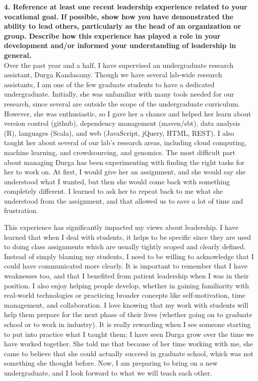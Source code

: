 \documentclass{article}
\begin{document}
\pagestyle{plain}

\noindent\textbf{4.  Reference at least one recent leadership experience related to your vocational goal. If possible, show how you have demonstrated the ability to lead others, particularly as the head of an organization or group. Describe how this experience has played a role in your development and/or informed your understanding of leadership in general.}\\

Over the past year and a half, I have supervised an undergraduate research assistant, Durga Kandasamy.  
Though we have several lab-wide research assistants, I am one of the few graduate students to have a dedicated undergraduate.
Initially, she was unfamiliar with many tools needed for our research, since several are outside the scope of the undergraduate curriculum.
However, she was enthusiastic, so I gave her a chance and helped her learn about version control (github), dependency management (maven/sbt), data analysis (R), languages (Scala), and web (JavaScript, jQuery, HTML, REST).
I also taught her about several of our lab's research areas, including cloud computing, machine learning, and crowdsourcing, and genomics.
The most difficult part about managing Durga has been experimenting with finding the right tasks for her to work on.
At first, I would give her an assignment, and she would say she understood what I wanted, but then she would come back with something completely different.
I learned to ask her to repeat back to me what she understood from the assignment, and that allowed us to save a lot of time and frustration.

This experience has significantly impacted my views about leadership.
I have learned that when I deal with students, it helps to be specific since they are used to doing class assignments which are usually tightly scoped and clearly defined.
Instead of simply blaming my students, I need to be willing to acknowledge that I could have communicated more clearly.
It is important to remember that I have weaknesses too, and that I benefited from patient leadership when I was in their position.
I also enjoy helping people develop, whether in gaining familiarity with real-world technologies or practicing broader concepts like self-motivation, time management, and collaboration.
I love knowing that my work with students will help them prepare for the next phase of their lives (whether going on to graduate school or to work in industry).
It is really rewarding when I see someone starting to put into practice what I taught them; I have seen Durga grow over the time we have worked together.
She told me that because of her time working with me, she came to believe that she could actually succeed in graduate school, which was not something she thought before.
Now, I am preparing to bring on a new undergraduate, and I look forward to what we will teach each other.
\end{document}
